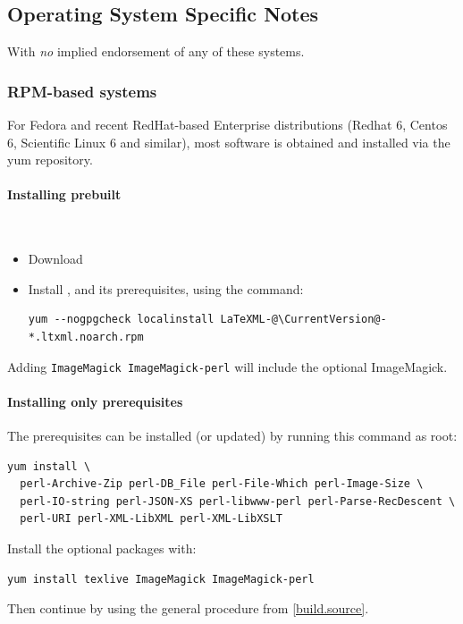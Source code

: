\documentclass{article}
\begin{document}
\subsection[OS-Specific Notes]{Operating System Specific Notes}\label{install.osnotes}
With \emph{no} implied endorsement of any of these systems.

\subsubsection[RPM-based systems]{RPM-based systems}\label{install.fedora}
For Fedora and recent RedHat-based Enterprise distributions
(Redhat 6, Centos 6, Scientific Linux 6 and similar),
most software is obtained and installed via the yum repository.

\paragraph{Installing prebuilt}\\
\begin{itemize}
\item Download \CurrentFedora
\item Install \LaTeXML, and its prerequisites, using the command:
\begin{lstlisting}[style=shell]
yum --nogpgcheck localinstall LaTeXML-@\CurrentVersion@-*.ltxml.noarch.rpm
\end{lstlisting}
\end{itemize}
Adding \texttt{ImageMagick ImageMagick-perl} will include the optional ImageMagick.

\paragraph{Installing only prerequisites}
The prerequisites can be installed (or updated) by running this command as root: 
\begin{lstlisting}[style=shell]
yum install \
  perl-Archive-Zip perl-DB_File perl-File-Which perl-Image-Size \
  perl-IO-string perl-JSON-XS perl-libwww-perl perl-Parse-RecDescent \
  perl-URI perl-XML-LibXML perl-XML-LibXSLT
\end{lstlisting}
Install the optional packages with:
\begin{lstlisting}[style=shell]
yum install texlive ImageMagick ImageMagick-perl
\end{lstlisting}
Then continue by using the general procedure from \ref{build.source}.

\end{document}
